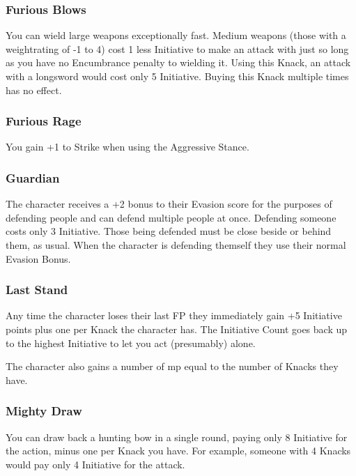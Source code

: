 \begin{multicols}{2}
\subsubsection{Furious Blows}\label{furiousblows}

You can wield large weapons exceptionally fast.
Medium weapons (those with a \gls{weightrating} of -1 to 4) cost 1 less Initiative to make an attack with just so long as you have no Encumbrance penalty to wielding it.
Using this Knack, an attack with a longsword would cost only 5 Initiative.
Buying this Knack multiple times has no effect.

\subsubsection{Furious Rage}

You gain +1 to Strike when using the Aggressive Stance.

\subsubsection{Guardian}

The character receives a +2 bonus to their Evasion score for the purposes of defending people and can defend multiple people at once.
Defending someone costs only 3 Initiative.
Those being defended must be close beside or behind them, as usual.
When the character is defending themself they use their normal Evasion Bonus.

\subsubsection{Last Stand}

Any time the character loses their last FP they immediately gain +5 Initiative points plus one per Knack the character has. The Initiative Count goes back up to the highest Initiative to let you act (presumably) alone.

The character also gains a number of \gls{mp} equal to the number of Knacks they have.

\subsubsection{Mighty Draw}

You can draw back a hunting bow in a single \gls{round}, paying only 8 Initiative for the action, minus one per Knack you have. For example, someone with 4 Knacks would pay only 4 Initiative for the attack.


\end{multicols}
